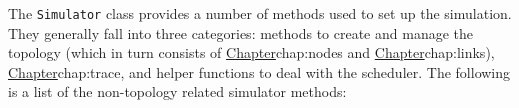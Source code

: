 The {\tt Simulator} class provides a number of methods used
to set up the simulation.
They generally fall into three categories:
methods to create and manage the topology 
(which in turn consists of
\href{managing the nodes}{Chapter}{chap:nodes} and
\href{managing t                                                                                                                                                                                                                                               







                                                                                                                                                                                                                                                               







                                                                                                                                                                                                                                                               







              he links}{Chapter}{chap:links}),
\href{methods to perform tracing}{Chapter}{chap:trace},
and helper functions to deal with the scheduler.
The following is a list of the non-topology related simulator methods:
